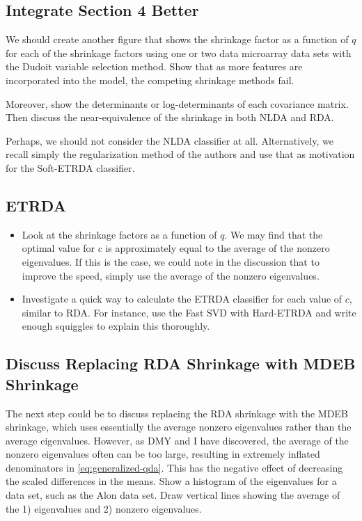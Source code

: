 \documentclass[11pt]{article}
\begin{document}
\subsection{Integrate Section 4 Better}

We should create another figure that shows the shrinkage factor as a function of $q$ for each of the shrinkage factors using one or two data microarray data sets with the Dudoit variable selection method. Show that as more features are incorporated into the model, the competing shrinkage methods fail.

Moreover, show the determinants or log-determinants of each covariance matrix. Then discuss the near-equivalence of the shrinkage in both NLDA and RDA.

Perhaps, we should not consider the NLDA classifier at all. Alternatively, we recall simply the regularization method of the authors and use that as motivation for the Soft-ETRDA classifier.

\subsection{ETRDA}

\begin{itemize}
	\item Look at the shrinkage factors as a function of $q$. We may find that the optimal value for $c$ is approximately equal to the average of the nonzero eigenvalues. If this is the case, we could note in the discussion that to improve the speed, simply use the average of the nonzero eigenvalues.
	\item Investigate a quick way to calculate the ETRDA classifier for each value of $c$, similar to RDA. For instance, use the Fast SVD with Hard-ETRDA and write enough squiggles to explain this thoroughly.
\end{itemize}

\subsection{Discuss Replacing RDA Shrinkage with MDEB Shrinkage}

The next step could be to discuss replacing the RDA shrinkage with the MDEB shrinkage, which uses essentially the average nonzero eigenvalues rather than the average eigenvalues. However, as DMY and I have discovered, the average of the nonzero eigenvalues often can be too large, resulting in extremely inflated denominators in \eqref{eq:generalized-qda}. This has the negative effect of decreasing the scaled differences in the means. Show a histogram of the eigenvalues for a data set, such as the Alon data set. Draw vertical lines showing the average of the 1) eigenvalues and 2) nonzero eigenvalues.
\end{document}
